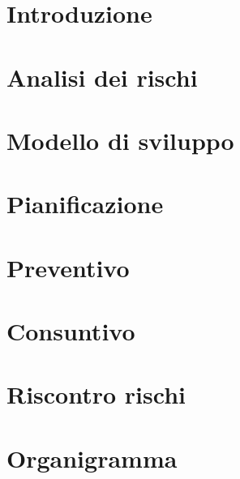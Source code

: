 \documentclass[]{article}
\begin{document}
	
	
	\newpage
	
	
	\section{Introduzione}
	
	\newpage
	
	\section{Analisi dei rischi}
	
	\newpage
	
	\section{Modello di sviluppo}
	
	\newpage

	\section{Pianificazione}
	
	\newpage
	
	\section{Preventivo}
	
	\newpage
	
	\section{Consuntivo}
	
	\newpage
	
	\section{Riscontro rischi}
	
	\newpage
	
	\section{Organigramma}
	
	\newpage
	
\end{document}
